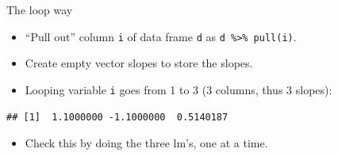 \documentclass[
  ignorenonframetext,
]{beamer}
\newenvironment{Shaded}{\begin{snugshade}}{\end{snugshade}}
\newcommand{\ControlFlowTok}[1]{\textcolor[rgb]{0.13,0.29,0.53}{\textbf{#1}}}
\newcommand{\DecValTok}[1]{\textcolor[rgb]{0.00,0.00,0.81}{#1}}
\newcommand{\KeywordTok}[1]{\textcolor[rgb]{0.13,0.29,0.53}{\textbf{#1}}}
\newcommand{\NormalTok}[1]{#1}
\newcommand{\OperatorTok}[1]{\textcolor[rgb]{0.81,0.36,0.00}{\textbf{#1}}}
\newcommand{\StringTok}[1]{\textcolor[rgb]{0.31,0.60,0.02}{#1}}
\providecommand{\tightlist}{%
  \setlength{\itemsep}{0pt}\setlength{\parskip}{0pt}}
\begin{document}
\begin{frame}[fragile]{The loop way}
\protect\hypertarget{the-loop-way}{}

\begin{itemize}
\tightlist
\item
  ``Pull out'' column \texttt{i} of data frame \texttt{d} as
  \texttt{d\ \%\textgreater{}\%\ pull(i)}.
\item
  Create empty vector slopes to store the slopes.
\item
  Looping variable \texttt{i} goes from 1 to 3 (3 columns, thus 3
  slopes):
\end{itemize}

\begin{Shaded}
\end{Shaded}

\begin{verbatim}
## [1]  1.1000000 -1.1000000  0.5140187
\end{verbatim}

\begin{itemize}
\tightlist
\item
  Check this by doing the three lm's, one at a time.
\end{itemize}

\end{frame}
\end{document}
